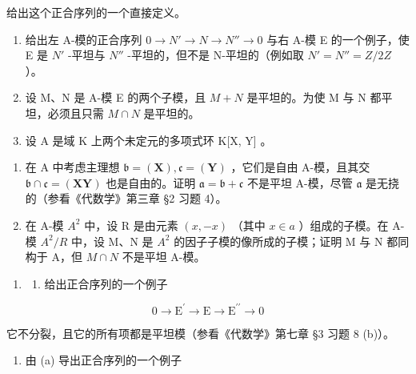 给出这个正合序列的一个直接定义。


\begin{enumerate}
\def\labelenumi{\arabic{enumi}.}
\item
  给出左 A-模的正合序列 \(0 \rightarrow N' \rightarrow N \rightarrow N'' \rightarrow 0\) 与右 A-模 E 的一个例子，使 E 是 \(N'\) -平坦与 \(N''\) -平坦的，但不是 N-平坦的（例如取 \(N' = N'' = Z/2Z\) ）。
\item
  设 M、N 是 A-模 E 的两个子模，且 \(M + N\) 是平坦的。为使 M 与 N 都平坦，必须且只需 \(M \cap N\) 是平坦的。
\item
  设 A 是域 K 上两个未定元的多项式环 K{[}X, Y{]} 。
\end{enumerate}

\begin{enumerate}
\def\labelenumi{(\alph{enumi})}
\item
  在 A 中考虑主理想 \(\mathfrak{b} = (\mathbf{X}), \mathfrak{c} = (\mathbf{Y})\) ，它们是自由 A-模，且其交 \(\mathfrak{b} \cap \mathfrak{c} = (\mathbf{XY})\) 也是自由的。证明 \(\mathfrak{a} = \mathfrak{b} + \mathfrak{c}\) 不是平坦 A-模，尽管 \(\mathfrak{a}\) 是无挠的（参看《代数学》第三章 §2 习题 4）。
\item
  在 A-模 \(A^{2}\) 中，设 R 是由元素 \((x, -x)\) （其中 \(x \in a\) ）组成的子模。在 A-模 \(A^{2}/R\) 中，设 M、N 是 \(A^{2}\) 的因子子模的像所成的子模；证明 M 与 N 都同构于 A，但 \(M \cap N\) 不是平坦 A-模。
\end{enumerate}

\begin{enumerate}
\def\labelenumi{\arabic{enumi}.}
\setcounter{enumi}{3}
\tightlist
\item
  \begin{enumerate}
  \def\labelenumii{(\alph{enumii})}
  \tightlist
  \item
    给出正合序列的一个例子
  \end{enumerate}
\end{enumerate}

\[
0 \rightarrow \mathrm{E} ^ {\prime} \rightarrow \mathrm{E} \rightarrow \mathrm{E} ^ {\prime \prime} \rightarrow 0
\]

它不分裂，且它的所有项都是平坦模（参看《代数学》第七章 §3 习题 8 (b)）。

\begin{enumerate}
\def\labelenumi{(\alph{enumi})}
\setcounter{enumi}{1}
\tightlist
\item
  由 (a) 导出正合序列的一个例子
\end{enumerate}


